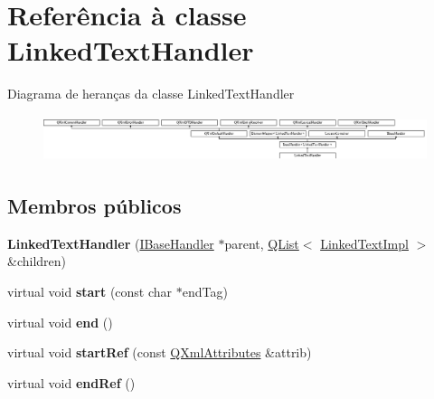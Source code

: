 \hypertarget{class_linked_text_handler}{\section{Referência à classe Linked\-Text\-Handler}
\label{class_linked_text_handler}
}
Diagrama de heranças da classe Linked\-Text\-Handler\begin{figure}[H]
\begin{center}
\leavevmode
\includegraphics[height=1.350211cm]{class_linked_text_handler}
\end{center}
\end{figure}
\subsection*{Membros públicos}
\begin{DoxyCompactItemize}
\item 
\hypertarget{class_linked_text_handler_a9f2a72aab41e8ac949ad16de3d96dc0a}{{\bfseries Linked\-Text\-Handler} (\hyperlink{class_i_base_handler}{I\-Base\-Handler} $\ast$parent, \hyperlink{class_q_list}{Q\-List}$<$ \hyperlink{class_linked_text_impl}{Linked\-Text\-Impl} $>$ \&children)}\label{class_linked_text_handler_a9f2a72aab41e8ac949ad16de3d96dc0a}

\item 
\hypertarget{class_linked_text_handler_a9175953c17170b1501fa785a677bbe4d}{virtual void {\bfseries start} (const char $\ast$end\-Tag)}\label{class_linked_text_handler_a9175953c17170b1501fa785a677bbe4d}

\item 
\hypertarget{class_linked_text_handler_aaf81d3fdaf258088d7692fa70cece087}{virtual void {\bfseries end} ()}\label{class_linked_text_handler_aaf81d3fdaf258088d7692fa70cece087}

\item 
\hypertarget{class_linked_text_handler_a64b60752227d7af719398c2683cb17bf}{virtual void {\bfseries start\-Ref} (const \hyperlink{class_q_xml_attributes}{Q\-Xml\-Attributes} \&attrib)}\label{class_linked_text_handler_a64b60752227d7af719398c2683cb17bf}

\item 
\hypertarget{class_linked_text_handler_a5eda546cbda5a0080fd4b49b62ce964e}{virtual void {\bfseries end\-Ref} ()}\label{class_linked_text_handler_a5eda546cbda5a0080fd4b49b62ce964e}

\end{DoxyCompactItemize}
